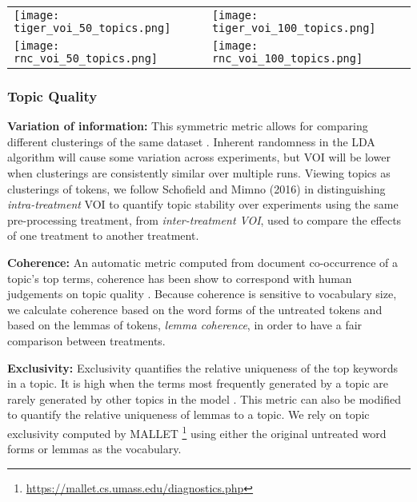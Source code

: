 \documentclass[11pt,a4paper]{article}
\begin{document}
\begin{figure*}[t]
    \label{fig:voi}
    \begin{tabular}{ll}
        \texttt{[image: tiger\_voi\_50\_topics.png]} & \texttt{[image: tiger\_voi\_100\_topics.png]} \\
        \texttt{[image: rnc\_voi\_50\_topics.png]} & \texttt{[image: rnc\_voi\_100\_topics.png]}
    \end{tabular}
\end{figure*}

\subsubsection{Topic Quality}
\textbf{Variation of information:} This symmetric metric allows for comparing different clusterings of the same dataset \cite{Meila2003ComparingCB}. Inherent randomness in the LDA algorithm will cause some variation across experiments, but VOI will be lower when clusterings are consistently similar over multiple runs. Viewing topics as clusterings of tokens, we follow Schofield and Mimno (2016) in distinguishing \textit{intra-treatment} VOI to quantify topic stability over experiments using the same pre-processing treatment,  from \textit{inter-treatment VOI}, used to compare the effects of one treatment to another treatment.

\textbf{Coherence:} An automatic metric computed from document co-occurrence of a topic's top terms, coherence has been show to correspond with human judgements on topic quality \cite{mimno2011optimizing}. Because coherence is sensitive to vocabulary size, we calculate coherence based on the word forms of the untreated tokens \cite{schofield-mimno-2016-comparing} and based on the lemmas of tokens, \textit{lemma coherence}, in order to have a fair comparison between treatments.

\textbf{Exclusivity:} Exclusivity quantifies the relative uniqueness of the top keywords in a topic. It is high when the terms most frequently generated by a topic are rarely generated by other topics in the model \cite{bischof2012exclusivity}. This metric can also be modified to quantify the relative uniqueness of lemmas to a topic. We rely on topic exclusivity computed by MALLET \footnote{\url{https://mallet.cs.umass.edu/diagnostics.php}} using either the original untreated word forms or lemmas as the vocabulary.
\end{document}
